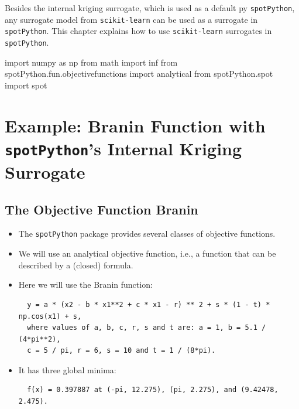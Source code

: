 \documentclass[
  letterpaper,
  DIV=11,
  numbers=noendperiod]{scrreprt}
\newenvironment{Shaded}{\begin{snugshade}}{\end{snugshade}}
\newcommand{\ImportTok}[1]{\textcolor[rgb]{0.00,0.46,0.62}{#1}}
\newcommand{\NormalTok}[1]{\textcolor[rgb]{0.00,0.23,0.31}{#1}}
\begin{document}
Besides the internal kriging surrogate, which is used as a default py
\texttt{spotPython}, any surrogate model from \texttt{scikit-learn} can
be used as a surrogate in \texttt{spotPython}. This chapter explains how
to use \texttt{scikit-learn} surrogates in \texttt{spotPython}.

\begin{Shaded}
\begin{Highlighting}[]
\ImportTok{import}\NormalTok{ numpy }\ImportTok{as}\NormalTok{ np}
\ImportTok{from}\NormalTok{ math }\ImportTok{import}\NormalTok{ inf}
\ImportTok{from}\NormalTok{ spotPython.fun.objectivefunctions }\ImportTok{import}\NormalTok{ analytical}
\ImportTok{from}\NormalTok{ spotPython.spot }\ImportTok{import}\NormalTok{ spot}
\end{Highlighting}
\end{Shaded}

\hypertarget{example-branin-function-with-spotpythons-internal-kriging-surrogate}{%
\section{\texorpdfstring{Example: Branin Function with
\texttt{spotPython}'s Internal Kriging
Surrogate}{Example: Branin Function with spotPython's Internal Kriging Surrogate}}\label{example-branin-function-with-spotpythons-internal-kriging-surrogate}}

\hypertarget{the-objective-function-branin-1}{%
\subsection{The Objective Function
Branin}\label{the-objective-function-branin-1}}

\begin{itemize}
\item
  The \texttt{spotPython} package provides several classes of objective
  functions.
\item
  We will use an analytical objective function, i.e., a function that
  can be described by a (closed) formula.
\item
  Here we will use the Branin function:

\begin{verbatim}
  y = a * (x2 - b * x1**2 + c * x1 - r) ** 2 + s * (1 - t) * np.cos(x1) + s,
  where values of a, b, c, r, s and t are: a = 1, b = 5.1 / (4*pi**2),
  c = 5 / pi, r = 6, s = 10 and t = 1 / (8*pi).
\end{verbatim}
\item
  It has three global minima:

\begin{verbatim}
  f(x) = 0.397887 at (-pi, 12.275), (pi, 2.275), and (9.42478, 2.475).
\end{verbatim}
\end{itemize}
\end{document}
